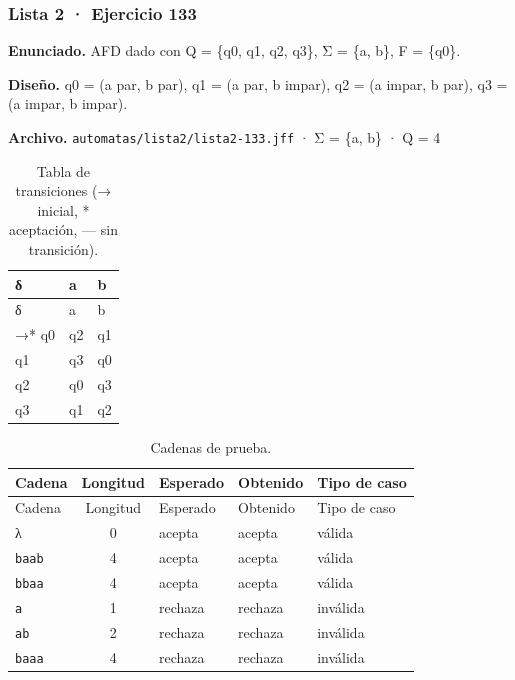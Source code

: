\hypertarget{lista-2-ejercicio-133}{%
\subsubsection{Lista 2 · Ejercicio 133}\label{lista-2-ejercicio-133}}

\textbf{Enunciado.} AFD dado con Q = \{q0, q1, q2, q3\}, Σ = \{a, b\}, F = \{q0\}.

\textbf{Diseño.} q0 = (a par, b par), q1 = (a par, b impar), q2 = (a impar, b par), q3 = (a impar, b impar).

\textbf{Archivo.} \texttt{automatas/lista2/lista2-133.jff} · Σ = \{a, b\} · \textbar Q\textbar{} = 4

\begin{longtable}[]{@{}lll@{}}
\caption{Tabla de transiciones (→ inicial, * aceptación, --- sin transición).}\tabularnewline
\toprule\noalign{}
δ & a & b \\
\midrule\noalign{}
\endfirsthead
\toprule\noalign{}
δ & a & b \\
\midrule\noalign{}
\endhead
\bottomrule\noalign{}
\endlastfoot
→* q0 & q2 & q1 \\
q1 & q3 & q0 \\
q2 & q0 & q3 \\
q3 & q1 & q2 \\
\end{longtable}

\begin{longtable}[]{@{}lclll@{}}
\caption{Cadenas de prueba.}\tabularnewline
\toprule\noalign{}
Cadena & Longitud & Esperado & Obtenido & Tipo de caso \\
\midrule\noalign{}
\endfirsthead
\toprule\noalign{}
Cadena & Longitud & Esperado & Obtenido & Tipo de caso \\
\midrule\noalign{}
\endhead
\bottomrule\noalign{}
\endlastfoot
λ & 0 & acepta & acepta & válida \\
\texttt{baab} & 4 & acepta & acepta & válida \\
\texttt{bbaa} & 4 & acepta & acepta & válida \\
\texttt{a} & 1 & rechaza & rechaza & inválida \\
\texttt{ab} & 2 & rechaza & rechaza & inválida \\
\texttt{baaa} & 4 & rechaza & rechaza & inválida \\
\end{longtable}


